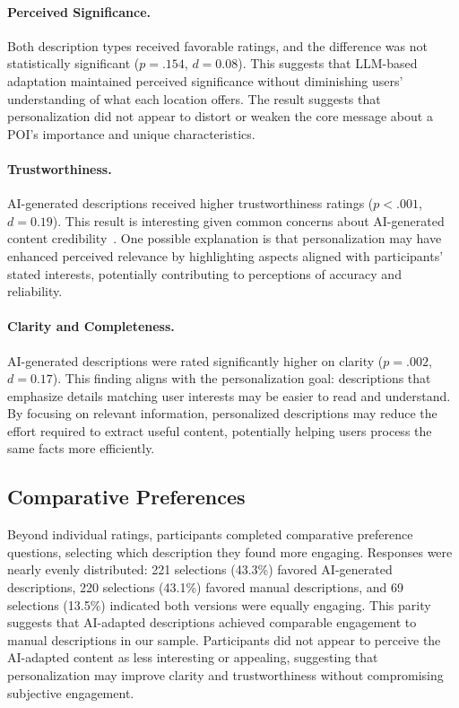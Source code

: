 \paragraph{Perceived Significance.}
Both description types received favorable ratings, and the difference was not statistically significant ($p = .154$, $d = 0.08$). This suggests that LLM-based adaptation maintained perceived significance without diminishing users' understanding of what each location offers. The result suggests that personalization did not appear to distort or weaken the core message about a POI's importance and unique characteristics.
\vspace{-0.8em}
\paragraph{Trustworthiness.}
AI-generated descriptions received higher trustworthiness ratings ($p < .001$, $d = 0.19$). This result is interesting given common concerns about AI-generated content credibility~\cite{li_generative_2025}. One possible explanation is that personalization may have enhanced perceived relevance by highlighting aspects aligned with participants' stated interests, potentially contributing to perceptions of accuracy and reliability.
\vspace{-0.8em}
\paragraph{Clarity and Completeness.}
AI-generated descriptions were rated significantly higher on clarity ($p = .002$, $d = 0.17$). This finding aligns with the personalization goal: descriptions that emphasize details matching user interests may be easier to read and understand. By focusing on relevant information, personalized descriptions may reduce the effort required to extract useful content, potentially helping users process the same facts more efficiently.

\subsection{Comparative Preferences}
Beyond individual ratings, participants completed comparative preference questions, selecting which description they found more engaging. Responses were nearly evenly distributed: 221 selections (43.3\%) favored AI-generated descriptions, 220 selections (43.1\%) favored manual descriptions, and 69 selections (13.5\%) indicated both versions were equally engaging. This parity suggests that AI-adapted descriptions achieved comparable engagement to manual descriptions in our sample. Participants did not appear to perceive the AI-adapted content as less interesting or appealing, suggesting that personalization may improve clarity and trustworthiness without compromising subjective engagement.

